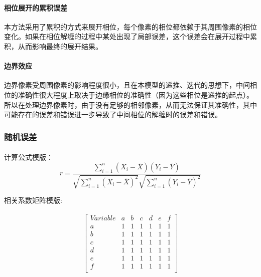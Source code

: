 \documentclass[a4paper]{article}
\begin{document}
	\paragraph{相位展开的累积误差}
	本方法采用了累积的方式来展开相位，每个像素的相位都依赖于其周围像素的相位变化。如果在相位解缠的过程中某处出现了局部误差，这个误差会在展开过程中累积，从而影响最终的展开结果。\par

	\paragraph{边界效应}
	边界像素受周围像素的影响程度很小，且在本模型的递推、迭代的思想下，中间相位的准确性很大程度上取决于边缘相位的准确性（因为这些相位是递推的起点）。所以在处理边界像素时，由于没有足够的相邻像素，从而无法保证其准确性，其中可能存在的误差和错误进一步导致了中间相位的解缠时的误差和错误。\par

	\subsubsection{随机误差}

	\paragraph{}




	
	计算公式模版：
	\begin{equation}
		r=\frac{\sum_{i=1}^n\left(X_i-\bar{X}\right)\left(Y_i-\bar{Y}\right)}{\sqrt{\sum_{i=1}^n\left(X_i-\bar{X}\right)^2} \sqrt{\sum_{i=1}^n\left(Y_i-\bar{Y}\right)^2}}
	\end{equation}
	
	相关系数矩阵模版:
	
	\begin{gather*}
		\begin{bmatrix}
			Variable & a & b & c & d & e & f \\
			a & 1 & 1 & 1 & 1 & 1 & 1 \\
			b & 1 & 1 & 1 & 1 & 1 & 1 \\
			c & 1 & 1 & 1 & 1 & 1 & 1 \\
			d & 1 & 1 & 1 & 1 & 1 & 1 \\
			e & 1 & 1 & 1 & 1 & 1 & 1 \\
			f & 1 & 1 & 1 & 1 & 1 & 1 \\
		\end{bmatrix}
	\end{gather*}
	
\end{document}
